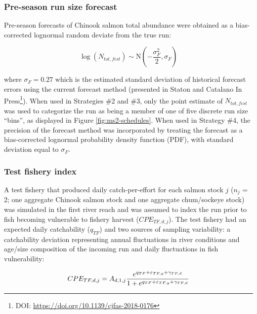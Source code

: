 \documentclass[12pt,]{book}
\let\rmarkdownfootnote\footnote%
\def\footnote{\protect\rmarkdownfootnote}
\theoremstyle{definition}
\theoremstyle{definition}
\theoremstyle{definition}
\theoremstyle{remark}
\begin{document}
\subsubsection{Pre-season run size forecast}\label{fcst}

\noindent
Pre-season forecasts of Chinook salmon total abundance were obtained as
a bias-corrected lognormal random deviate from the true run:

\begin{equation}
  \log\left(N_{tot,fcst}\right) \sim \text{N}(-\frac{\sigma_F^2}{2}, \sigma_F)
  \label{eq:get-fcst}
\end{equation}

\noindent
where \(\sigma_F = 0.27\) which is the estimated standard deviation of
historical forecast errors using the current forecast method (presented
in Staton and Catalano In Press\footnote{DOI:
  \url{https://doi.org/10.1139/cjfas-2018-0176}}). When used in
Strategies \#2 and \#3, only the point estimate of \(N_{tot,fcst}\) was
used to categorize the run as being a member of one of five discrete run
size ``bins'', as displayed in Figure \ref{fig:ms2-schedules}. When used
in Strategy \#4, the precision of the forecast method was incorporated
by treating the forecast as a bias-corrected lognormal probability
density function (PDF), with standard deviation equal to \(\sigma_F\).

\subsubsection{Test fishery index}\label{tf}

\noindent
A test fishery that produced daily catch-per-effort for each salmon
stock \(j\) (\(n_j\) = 2; one aggregate Chinook salmon stock and one
aggregate chum/sockeye stock) was simulated in the first river reach and
was assumed to index the run prior to fish becoming vulnerable to
fishery harvest (\(CPE_{TF,d,j}\)). The test fishery had an expected
daily catchability (\(q_{TF}\)) and two sources of sampling variability:
a catchability deviation representing annual fluctuations in river
conditions and age/size composition of the incoming run
\citep{flynn-hilborn-2004} and daily fluctuations in fish vulnerability:

\begin{equation}
  CPE_{TF,d,j} = A_{d,1,j} \space \frac{e^{q_{TF} + \varepsilon_{TF,y} + \gamma_{TF,d}}}{1+e^{q_{TF} + \varepsilon_{TF,y} + \gamma_{TF,d}}}
  \label{eq:get-tf-cpe}
\end{equation}
\end{document}
